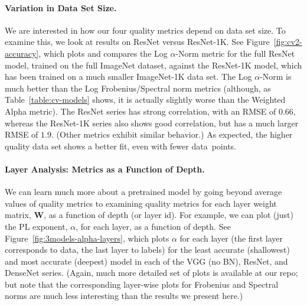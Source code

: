 \paragraph{Variation in Data Set Size.}

We are interested in how our four quality metrics depend on data set size.
To examine this, we look at results on ResNet versus ResNet-1K.
See Figure~\ref{fig:cv2-accuracy}, which plots and compares the Log $\alpha$-Norm metric 
for the full ResNet model, trained on the full ImageNet dataset, against the ResNet-1K model, which has been trained on a much smaller ImageNet-1K data set.
The Log $\alpha$-Norm is much better than the Log Frobenius/Spectral norm metrics (although, as Table~\ref{table:cv-models} shows, it is actually slightly worse than the Weighted Alpha metric).
The ResNet series has strong correlation, with an RMSE of $0.66$, whereas the ResNet-1K series also shows good correlation, but has a much larger RMSE of $1.9$.
(Other metrics exhibit similar behavior.)
As expected, the higher quality data set shows a better fit, even with fewer data~points.


\paragraph{Layer Analysis: Metrics as a Function of Depth.}

We can learn much more about a pretrained model by going beyond average values of quality metrics to examining quality metrics for each layer weight matrix, $\mathbf{W}$, as a function of depth (or layer id).  %
For example, we can 
plot (just) the PL exponent, $\alpha$, for each layer, %
as a function of depth.
%
See Figure~\ref{fig:3models-alpha-layers}, which plots $\alpha$ for each layer (the first layer corresponds to data, the last layer to labels) for the least accurate (shallowest) and most accurate (deepest) model in each of the VGG (no BN), ResNet, and DenseNet series.
(Again, much more detailed set of plots is available at our repo; but note that the corresponding layer-wise plots for Frobenius and Spectral norms are much less interesting than the results we present here.)

